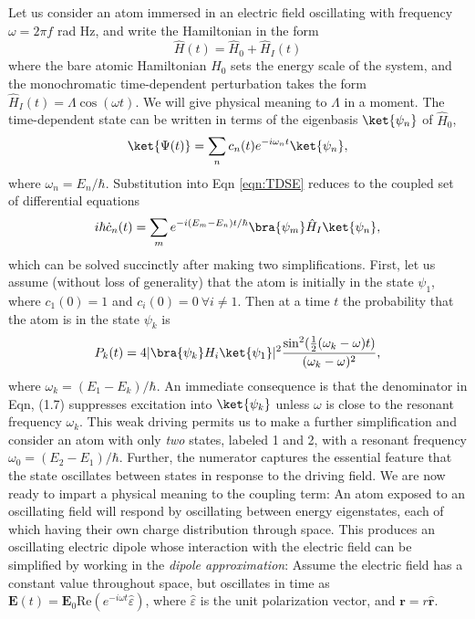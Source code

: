 	Let us consider an atom immersed in an electric field oscillating with frequency $\omega = 2 \pi f$ rad Hz, and write the Hamiltonian in the form
	\begin{equation}
		\hat{H}(t) = \hat{H}_0 + \hat{H}_{I}(t)
	\end{equation}
	where the bare atomic Hamiltonian $H_0$ sets the energy scale of the system, and the monochromatic time-dependent perturbation takes the form $\hat{H}_I(t) = \Lambda \cos(\omega t)$.
	We will give physical meaning to $\Lambda$ in a moment.
	The time-dependent state can be written in terms of the eigenbasis $\ket{\psi_n}$ of $\hat{H}_0$,
	\begin{equation}
		\ket{\Psi(t)} = \sum_n c_n(t)e^{-i\omega_n t}\ket{\psi_n},
	\end{equation}
	where $\omega_n= E_n/\hbar$.
	Substitution into Eqn \ref{eqn:TDSE} reduces to the coupled set of differential equations 
	\begin{equation}
		i\hbar\dot{c}_n(t) = \sum_m e^{-i(E_m-E_n)t/\hbar}\bra{\psi_m}\hat{H}_I\ket{\psi_n},
	\end{equation} 
	which can be solved succinctly after making two simplifications.
	First, let us assume (without loss of generality) that the atom is initially in the state $\psi_1$, where $c_1(0)=1$ and $c_i(0)=0~\forall i\neq1$.
	Then at a time $t$ the probability that the atom is in the state $\psi_k$ is \cite{FootAtomic,BinneyBook}
	\begin{equation}
		P_k(t) = 4|\bra{\psi_k}H_i\ket{\psi_1}|^2 \frac{\sin^2(\frac{1}{2}(\omega_k-\omega)t)}{(\omega_k-\omega)^2},
	\end{equation}
	where $\omega_k = (E_1-E_k)/\hbar$.
	An immediate consequence is that the denominator in Eqn, (1.7) suppresses excitation into $\ket{\psi_k}$ unless $\omega$ is close to the resonant frequency $\omega_k$.
	This weak driving permits us to make a further simplification and consider an atom with only \emph{two} states, labeled 1 and 2, with a resonant frequency $\omega_0 =(E_2-E_1)/\hbar$.
	Further, the numerator captures the essential feature that the state oscillates between states in response to the driving field.
	We are now ready to impart a physical meaning to the coupling term: An atom exposed to an oscillating field will respond by oscillating between energy eigenstates, each of which having their own charge distribution through space.
	This produces an oscillating electric dipole whose interaction with the electric field can be simplified by working in the \emph{dipole approximation}: Assume the electric field has a constant value throughout space, but oscillates in time as $\textbf{E}(t) = \textbf{E}_0 \textrm{Re}(e^{-i\omega t}\hat{\varepsilon})$, where $\hat{\varepsilon}$ is the unit polarization vector, and $\textbf{r} = r\hat{\textbf{r}}$.
